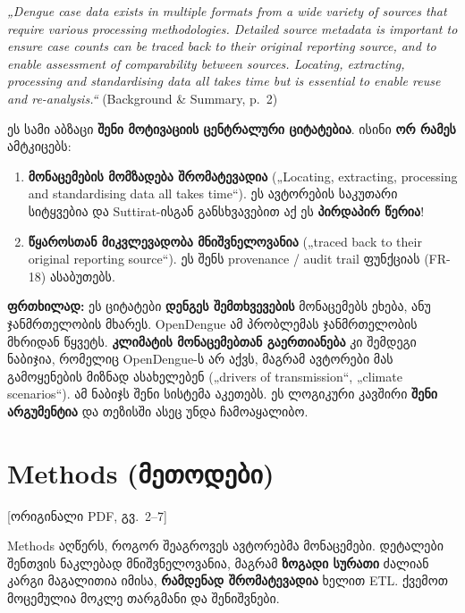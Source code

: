 \documentclass[11pt,a4paper]{article}
\newcommand{\imp}[1]{\textbf{\color{importred}#1}}
\newcommand{\pg}[1]{{\small\color{gray}[ორიგინალი PDF, გვ.~#1]}}
\begin{document}
\begin{citat}
\textit{„Dengue case data exists in multiple formats from a wide variety of sources that require various processing methodologies. Detailed source metadata is important to ensure case counts can be traced back to their original reporting source, and to enable assessment of comparability between sources. Locating, extracting, processing and standardising data all takes time but is essential to enable reuse and re-analysis.“} (Background \& Summary, p.~2)
\end{citat}

\begin{etl}
ეს სამი აბზაცი \imp{შენი მოტივაციის ცენტრალური ციტატებია}. ისინი \textbf{ორ რამეს} ამტკიცებს:
\begin{enumerate}[leftmargin=1.5em]
  \item \textbf{მონაცემების მომზადება შრომატევადია} („Locating, extracting, processing and standardising data all takes time“). ეს ავტორების საკუთარი სიტყვებია და Suttirat-ისგან განსხვავებით აქ ეს \textbf{პირდაპირ წერია}!
  \item \textbf{წყაროსთან მიკვლევადობა მნიშვნელოვანია} („traced back to their original reporting source“). ეს შენს provenance / audit trail ფუნქციას (FR-18) ასაბუთებს.
\end{enumerate}
\textbf{ფრთხილად:} ეს ციტატები \textbf{დენგეს შემთხვევების} მონაცემებს ეხება, ანუ ჯანმრთელობის მხარეს. OpenDengue ამ პრობლემას
ჯანმრთელობის მხრიდან წყვეტს. \textbf{კლიმატის მონაცემებთან გაერთიანება} კი შემდეგი ნაბიჯია, რომელიც OpenDengue-ს არ აქვს, მაგრამ
ავტორები მას გამოყენების მიზნად ასახელებენ („drivers of transmission“, „climate scenarios“). ამ ნაბიჯს შენი სისტემა აკეთებს.
ეს ლოგიკური კავშირი \textbf{შენი არგუმენტია} და თეზისში ასეც უნდა ჩამოაყალიბო.
\end{etl}

\section{Methods (მეთოდები)} \pg{2--7}

\begin{skipbox}
Methods აღწერს, როგორ შეაგროვეს ავტორებმა მონაცემები. დეტალები შენთვის ნაკლებად მნიშვნელოვანია, მაგრამ \textbf{ზოგადი სურათი}
ძალიან კარგი მაგალითია იმისა, \textbf{რამდენად შრომატევადია} ხელით ETL. ქვემოთ მოცემულია მოკლე თარგმანი და შენიშვნები.
\end{skipbox}
\end{document}
